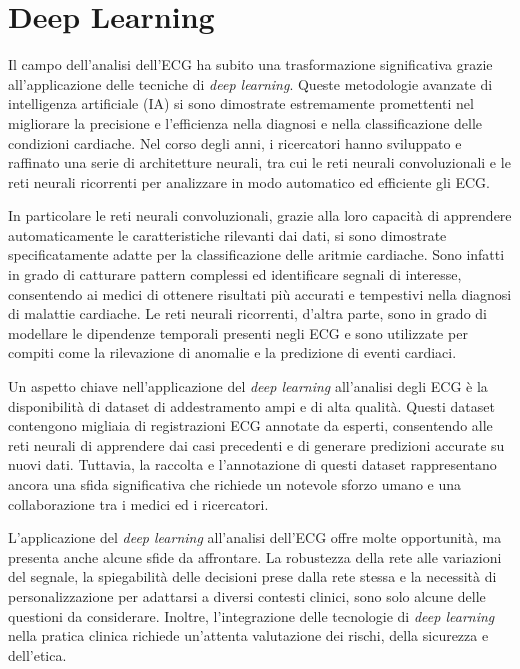 \section{Deep Learning}
\label{sec:deep}

Il campo dell'analisi dell'ECG ha subito una trasformazione significativa grazie all'applicazione delle tecniche di \textit{deep learning}. Queste metodologie avanzate di intelligenza artificiale (IA) si sono dimostrate estremamente promettenti nel migliorare la precisione e l'efficienza nella diagnosi e nella classificazione delle condizioni cardiache. Nel corso degli anni, i ricercatori hanno sviluppato e raffinato una serie di architetture neurali, tra cui le reti neurali convoluzionali e le reti neurali ricorrenti per analizzare in modo automatico ed efficiente gli ECG.

In particolare le reti neurali convoluzionali, grazie alla loro capacità di apprendere automaticamente le caratteristiche rilevanti dai dati, si sono dimostrate specificatamente adatte per la classificazione delle aritmie cardiache. Sono infatti in grado di catturare pattern complessi ed identificare segnali di interesse, consentendo ai medici di ottenere risultati più accurati e tempestivi nella diagnosi di malattie cardiache. Le reti neurali ricorrenti, d'altra parte, sono in grado di modellare le dipendenze temporali presenti negli ECG e sono utilizzate per compiti come la rilevazione di anomalie e la predizione di eventi cardiaci.

Un aspetto chiave nell'applicazione del \textit{deep learning} all'analisi degli ECG è la disponibilità di dataset di addestramento ampi e di alta qualità. Questi dataset contengono migliaia di registrazioni ECG annotate da esperti, consentendo alle reti neurali di apprendere dai casi precedenti e di generare predizioni accurate su nuovi dati. Tuttavia, la raccolta e l'annotazione di questi dataset rappresentano ancora una sfida significativa che richiede un notevole sforzo umano e una collaborazione tra i medici ed i ricercatori.

L'applicazione del \textit{deep learning} all'analisi dell'ECG offre molte opportunità, ma presenta anche alcune sfide da affrontare. La robustezza della rete alle variazioni del segnale, la spiegabilità delle decisioni prese dalla rete stessa e la necessità di personalizzazione per adattarsi a diversi contesti clinici, sono solo alcune delle questioni da considerare. Inoltre, l'integrazione delle tecnologie di \textit{deep learning} nella pratica clinica richiede un'attenta valutazione dei rischi, della sicurezza e dell'etica.

